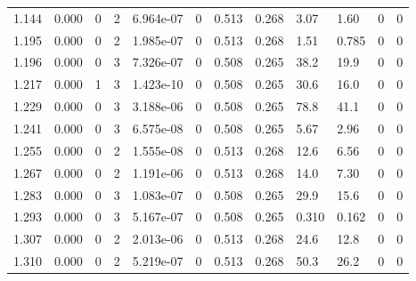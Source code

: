 \documentclass[preview]{standalone}
\begin{document}
{{{\begin{tabular}{L{1.2cm}C{1.2cm} C{0.3cm}C{0.5cm} C{1.4cm}C{1.4cm} C{1.4cm}C{1.4cm} C{1.6cm}C{1.6cm} C{1.6cm}C{1.6cm}}
  1.144  &  0.000  & 0     &  2 &  6.964e-07  & 0  &  0.513&   0.268& 3.07 & 1.60   &  0 & 0  \\ 
  1.195  &  0.000  & 0     &  2 &  1.985e-07  & 0  &  0.513&   0.268& 1.51 & 0.785   &  0 & 0  \\ 
  1.196  &  0.000  & 0     &  3 &  7.326e-07  & 0  &  0.508&   0.265& 38.2 & 19.9   &  0 & 0  \\ 
  1.217  &  0.000  & 1     &  3 &  1.423e-10  & 0  &  0.508&   0.265& 30.6 & 16.0   &  0 & 0  \\ 
  1.229  &  0.000  & 0     &  3 &  3.188e-06  & 0  &  0.508&   0.265& 78.8 & 41.1   &  0 & 0  \\ 
  1.241  &  0.000  & 0     &  3 &  6.575e-08  & 0  &  0.508&   0.265& 5.67 & 2.96   &  0 & 0  \\ 
  1.255  &  0.000  & 0     &  2 &  1.555e-08  & 0  &  0.513&   0.268& 12.6 & 6.56   &  0 & 0  \\ 
  1.267  &  0.000  & 0     &  2 &  1.191e-06  & 0  &  0.513&   0.268& 14.0 & 7.30   &  0 & 0  \\ 
  1.283  &  0.000  & 0     &  3 &  1.083e-07  & 0  &  0.508&   0.265& 29.9 & 15.6   &  0 & 0  \\ 
  1.293  &  0.000  & 0     &  3 &  5.167e-07  & 0  &  0.508&   0.265& 0.310 & 0.162   &  0 & 0  \\ 
  1.307  &  0.000  & 0     &  2 &  2.013e-06  & 0  &  0.513&   0.268& 24.6 & 12.8   &  0 & 0  \\ 
  1.310  &  0.000  & 0     &  2 &  5.219e-07  & 0  &  0.513&   0.268& 50.3 & 26.2   &  0 & 0  \\ 
\hline 
\end{tabular} 

}}}
\end{document}
